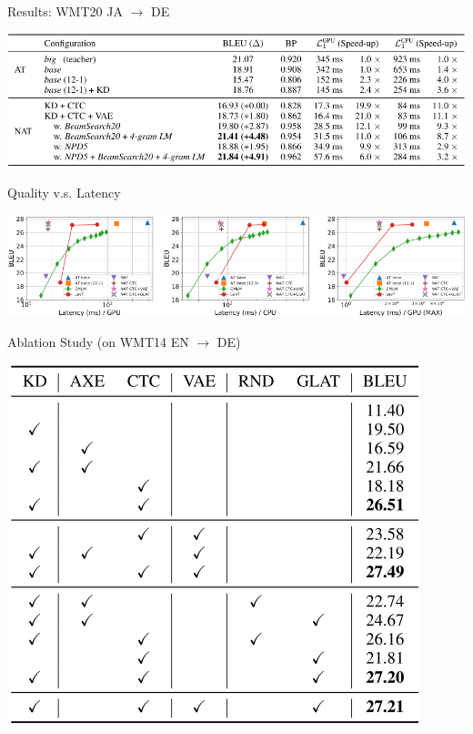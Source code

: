 \documentclass[unicode, 12pt, xdvipdfmx, aspectratio=43]{beamer}
\begin{document}
\begin{frame}[label={sec:org7866e4c}]{Results: WMT20 JA \(\rightarrow\) DE}
\begin{center}
\includegraphics[width=\linewidth]{./figure/Table3.pdf}
\end{center}
\end{frame}

\begin{frame}[label={sec:org1037328}]{Quality v.s. Latency}
\begin{center}
\includegraphics[width=\linewidth]{./figure/Figure4.pdf}
\end{center}
\end{frame}

\begin{frame}[label={sec:orgece0719}]{Ablation Study (on WMT14 EN \(\rightarrow\) DE)}
\begin{center}
\includegraphics[width=0.7\linewidth]{./figure/Table4.pdf}
\end{center}
\end{frame}
\end{document}
